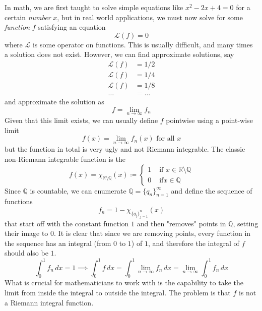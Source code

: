 In math, we are first taught to solve simple equations like $x^2 - 2x + 4 = 0$ for a certain \textit{number} $x$, but in real world applications, we must now solve for some \textit{function} $f$ satisfying an equation 
\begin{equation}
  \mathcal{L}(f) = 0
\end{equation}
where $\mathcal{L}$ is some operator on functions. This is usually difficult, and many times a solution does not exist. However, we can find approximate solutions, say 
\begin{align*}
  \mathcal{L}(f) & = 1/2 \\
  \mathcal{L}(f) & = 1/4 \\ 
  \mathcal{L}(f) & = 1/8 \\
  \ldots & = \ldots 
\end{align*}
and approximate the solution as 
\begin{equation}
  f = \lim_{n \rightarrow \infty} f_n 
\end{equation}
Given that this limit exists, we can usually define $f$ pointwise using a point-wise limit 
\begin{equation}
  f(x) = \lim_{n \rightarrow \infty} f_n (x) \text{ for all } x
\end{equation}
but the function in total is very ugly and not Riemann integrable. The classic non-Riemann integrable function is the 
\begin{equation}
  f(x) = \chi_{\mathbb{R} \setminus \mathbb{Q}} (x) \coloneqq \begin{cases} 
  1 & \text{ if } x \in \mathbb{R} \setminus \mathbb{Q} \\
  0 & \text{ if} x \in \mathbb{Q} 
  \end{cases}
\end{equation}
Since $\mathbb{Q}$ is countable, we can enumerate $\mathbb{Q} = \{q_n\}_{n=1}^\infty$ and define the sequence of functions 
\begin{equation}
  f_n = 1 - \chi_{\{q_j\}_{j=1}^n}(x)
\end{equation}
that start off with the constant function $1$ and then "removes" points in $\mathbb{Q}$, setting their image to $0$. It is clear that since we are removing points, every function in the sequence has an integral (from $0$ to $1$) of $1$, and therefore the integral of $f$ should also be $1$. 
\begin{equation}
  \int_0^1 f_n \, dx = 1 \implies \int_0^1 f \,dx = \int_0^1 \lim_{n \rightarrow \infty} f_n \,dx = \lim_{n \rightarrow \infty} \int_0^1 f_n \,dx
\end{equation}
What is crucial for mathematicians to work with is the capability to take the limit from inside the integral to outside the integral. The problem is that $f$ is not a Riemann integral function. 

